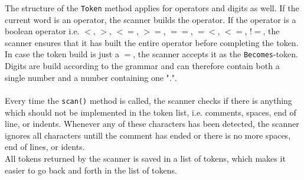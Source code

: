 The structure of the \texttt{Token} method applies for operators and digits as well. If the current word is an operator, the scanner builds the operator. If the operator is a boolean operator i.e. $<$, $>$, $<=$, $>=$, $==$, $=<$, $<=$, $!=$, the scanner ensures that it has built the entire operator before completing the token. In case the token build is just a $=$, the scanner accepts it as the \texttt{Becomes}-token.\\
Digits are build according to the grammar and can therefore contain both a single number and a number containing one ".".\\
\\
Every time the \texttt{scan()} method is called, the scanner checks if there is anything which should not be implemented in the token list, i.e. comments, spaces, end of line, or indents. Whenever any of these characters has been detected, the scanner ignores all characters untill the comment has ended or there is no more spaces, end of lines, or idents.\\
All tokens returned by the scanner is saved in a list of tokens, which makes it easier to go back and forth in the list of tokens.\\
